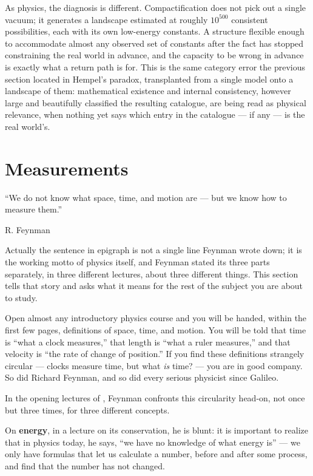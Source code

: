 As physics, the diagnosis is different. Compactification does not pick out a
single vacuum; it generates a landscape estimated at roughly $10^{500}$
consistent possibilities, each with its own low-energy constants. A structure
flexible enough to accommodate almost any observed set of constants after the
fact has stopped constraining the real world in advance, and the capacity to be
wrong in advance is exactly what a return path is for. This is the same
category error the previous section located in Hempel's paradox, transplanted
from a single model onto a landscape of them: mathematical existence and
internal consistency, however large and beautifully classified the resulting
catalogue, are being read as physical relevance, when nothing yet says which
entry in the catalogue --- if any --- is the real world's.

\section{Measurements}
\label{sec:rm-me}

\epigraph{``We do not know what space, time, and motion are --- 
but we know how to measure them.''}{R. Feynman}

Actually the sentence in epigraph  is not a single line Feynman wrote down; it
is the working motto of physics itself, and Feynman stated its three parts
separately, in three different lectures, about three different things. This
section tells that story and asks what it means for the rest of the subject you
are about to study.

Open almost any introductory physics course and you will be handed, within the
first few pages, definitions of space, time, and motion. You will be told that
time is ``what a clock measures,'' that length is ``what a ruler measures,''
and that velocity is ``the rate of change of position.'' If you find these
definitions strangely circular --- clocks measure time, but what \emph{is}
time? --- you are in good company. So did Richard Feynman, and so did every
serious physicist since Galileo.

In the opening lectures of \cite{flp1}, Feynman
confronts this circularity head-on, not once but three times, for three
different concepts.

On \textbf{energy}, in a lecture on its conservation, he is blunt: it is
important to realize that in physics today, he says, ``we have no knowledge of
what energy is'' --- we only have formulas that let us calculate a number,
before and after some process, and find that the number has not changed.

